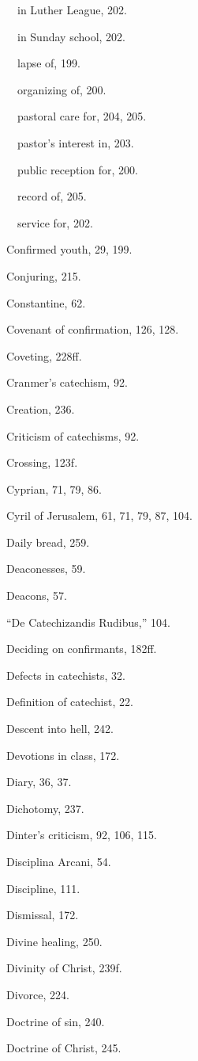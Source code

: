 \begin{originalinhalt}
 in Luther League, 202.

 in Sunday school, 202.

 lapse of, 199.

 organizing of, 200.

 pastoral care for, 204, 205.

 pastor’s interest in, 203.

 public reception for, 200.

 record of, 205.

 service for, 202.

Confirmed youth, 29, 199.

Conjuring, 215.

Constantine, 62.

Covenant of confirmation, 126, 128.

Coveting, 228ff.

Cranmer’s catechism, 92.

Creation, 236.

Criticism of catechisms, 92.

Crossing, 123f.

Cyprian, 71, 79, 86.

Cyril of Jerusalem, 61, 71, 79, 87, 104.


Daily bread, 259.

Deaconesses, 59.

Deacons, 57.

“De Catechizandis Rudibus,” 104.

Deciding on confirmants, 182ff.

Defects in catechists, 32.

Definition of catechist, 22.

Descent into hell, 242.

Devotions in class, 172.

Diary, 36, 37.

Dichotomy, 237.

Dinter’s criticism, 92, 106, 115.

Disciplina Arcani, 54.

Discipline, 111.

Dismissal, 172.

Divine healing, 250.

Divinity of Christ, 239f.

Divorce, 224.

Doctrine of sin, 240.

Doctrine of Christ, 245.


\end{originalinhalt}
